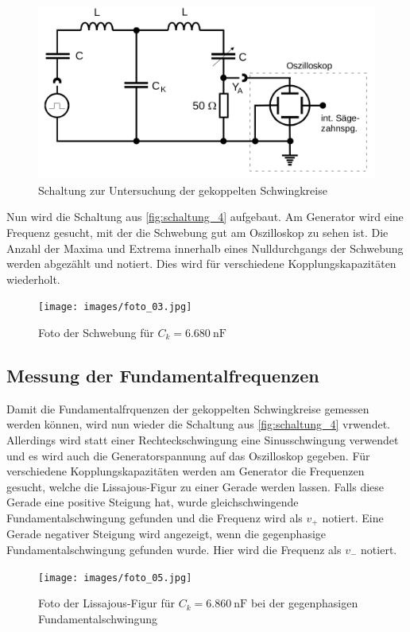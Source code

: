 \begin{figure}
    \centering
    \includegraphics[width=\textwidth/2]{images/schaltung_4.png}
    \caption{Schaltung zur Untersuchung der gekoppelten Schwingkreise\cite{V355}}
    \label{fig:schaltung_4}
\end{figure}

Nun wird die Schaltung aus \autoref{fig:schaltung_4} aufgebaut.
Am Generator wird eine Frequenz gesucht, mit der die Schwebung gut am Oszilloskop zu sehen ist. Die Anzahl der Maxima und Extrema innerhalb eines Nulldurchgangs der Schwebung werden abgezählt und notiert. 
Dies wird für verschiedene Kopplungskapazitäten wiederholt.

\begin{figure}
    \centering
    \texttt{[image: images/foto\_03.jpg]}
    \caption{Foto der Schwebung für $C_k = \SI{6.680}{\nano\farad}$}
    \label{fig:foto_03}
\end{figure}

\subsection{Messung der Fundamentalfrequenzen}

Damit die Fundamentalfrquenzen der gekoppelten Schwingkreise gemessen werden können, wird nun wieder die Schaltung aus \autoref{fig:schaltung_4} vrwendet.
Allerdings wird statt einer Rechteckschwingung eine Sinusschwingung verwendet und es wird auch die Generatorspannung auf das Oszilloskop gegeben.
Für verschiedene Kopplungskapazitäten werden am Generator die Frequenzen gesucht, welche die Lissajous-Figur zu einer Gerade werden lassen. 
Falls diese Gerade eine positive Steigung hat, wurde gleichschwingende Fundamentalschwingung gefunden und die Frequenz wird als $v_+$ notiert.
Eine Gerade negativer Steigung wird angezeigt, wenn die gegenphasige Fundamentalschwingung gefunden wurde. Hier wird die Frequenz als $v_-$ notiert.
\begin{figure}
    \centering
    \texttt{[image: images/foto\_05.jpg]}
    \caption{Foto der Lissajous-Figur für $C_k = \SI{6.860}{\nano\farad}$ bei der gegenphasigen Fundamentalschwingung}
    \label{fig:foto_05}
\end{figure}

